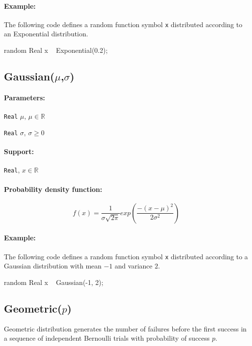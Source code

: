 \paragraph*{Example:}
The following code defines a random function symbol \verb|x| distributed according to an Exponential distribution.
\begin{blogcode}
random Real x ~ Exponential(0.2);
\end{blogcode}

\subsection{Gaussian($\mu$,$\sigma$)}

\paragraph*{Parameters:} 
\begin{itemize*}
\item[] \verb|Real|
 $\mu$, $\mu \in \mathbb{R}$
\item[] \verb|Real|
 $\sigma$, $\sigma \geq 0$ 
\end{itemize*}

\paragraph*{Support:} \verb|Real|, $x \in \mathbb{R}$ 

\paragraph*{Probability density function:}
\[
	f(x) = \frac{1}{\sigma \sqrt{2 \pi}} exp(\frac{-(x-\mu)^{2}}{2 \sigma^{2}})
\]

\paragraph*{Example:}
The following code defines a random function symbol \verb|x| distributed according to a Gaussian distribution with mean $-1$ and variance $2$.
\begin{blogcode}
random Real x ~ Gaussian(-1, 2);
\end{blogcode}

\subsection{Geometric($p$)}
Geometric distribution generates the number of failures before the first success in a sequence of independent Bernoulli trials with probability of success $p$.


